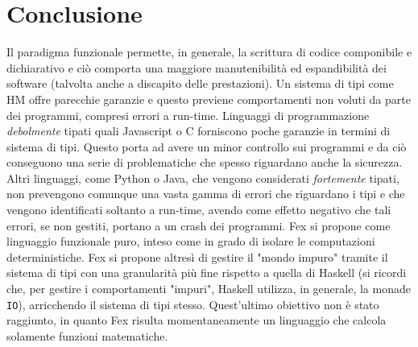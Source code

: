 \documentclass[10pt,a4paper]{article}
\begin{document}
\section{Conclusione}
Il paradigma funzionale permette, in generale, la scrittura di codice componibile e dichiarativo e ciò comporta una
maggiore manutenibilità ed espandibilità dei software (talvolta anche a discapito delle prestazioni). Un sistema di tipi
come HM offre parecchie garanzie e questo previene comportamenti non voluti da parte dei programmi, compresi errori
a run-time. Linguaggi di programmazione \textit{debolmente} tipati quali Javascript o C forniscono poche garanzie in termini
di sistema di tipi. Questo porta ad avere un minor controllo sui programmi e da ciò conseguono una serie di problematiche che
spesso riguardano anche la sicurezza. Altri linguaggi, come Python o Java, che vengono considerati \textit{fortemente} tipati,
non prevengono comunque una vasta gamma di errori che riguardano i tipi e che vengono identificati soltanto a run-time,
avendo come effetto negativo che tali errori, se non gestiti, portano a un crash dei programmi. Fex si propone come linguaggio
funzionale puro, inteso come in grado di isolare le computazioni deterministiche. Fex si propone altresì di gestire il
"mondo impuro" tramite il sistema di tipi con una granularità più fine rispetto a quella di Haskell
(si ricordi che, per gestire i comportamenti "impuri", Haskell utilizza, in generale, la monade \texttt{IO}), arricchendo il
sistema di tipi stesso.
Quest'ultimo obiettivo non è stato raggiunto, in quanto Fex risulta momentaneamente un linguaggio che calcola solamente funzioni
matematiche.
\end{document}
